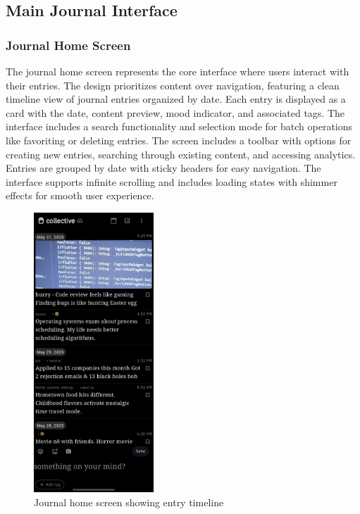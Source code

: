 \subsection{Main Journal Interface}

\subsubsection{Journal Home Screen}

The journal home screen represents the core interface where users interact with their entries. The design prioritizes content over navigation, featuring a clean timeline view of journal entries organized by date. Each entry is displayed as a card with the date, content preview, mood indicator, and associated tags. The interface includes a search functionality and selection mode for batch operations like favoriting or deleting entries. The screen includes a toolbar with options for creating new entries, searching through existing content, and accessing analytics. Entries are grouped by date with sticky headers for easy navigation. The interface supports infinite scrolling and includes loading states with shimmer effects for smooth user experience.

\nopagebreak
\begin{figure}[H]
\centering
\includegraphics[width=0.4\textwidth]{files/imgs/prototype/journal_screen.jpeg}
\caption{Journal home screen showing entry timeline}
\label{fig:journal-screen}
\end{figure}

